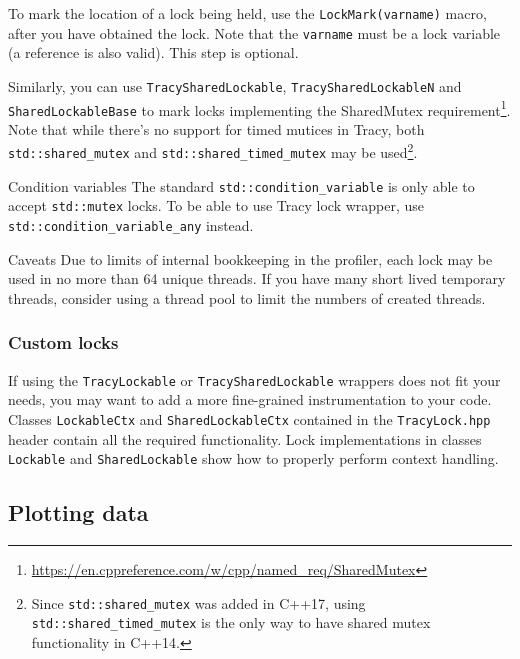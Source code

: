 \documentclass[hidelinks,titlepage,a4paper]{article}
\begin{document}
To mark the location of a lock being held, use the \texttt{LockMark(varname)} macro, after you have obtained the lock. Note that the \texttt{varname} must be a lock variable (a reference is also valid). This step is optional.

Similarly, you can use \texttt{TracySharedLockable}, \texttt{TracySharedLockableN} and \texttt{SharedLockableBase} to mark locks implementing the SharedMutex requirement\footnote{\url{https://en.cppreference.com/w/cpp/named_req/SharedMutex}}. Note that while there's no support for timed mutices in Tracy, both \texttt{std::shared\_mutex} and \texttt{std::shared\_timed\_mutex} may be used\footnote{Since \texttt{std::shared\_mutex} was added in C++17, using \texttt{std::shared\_timed\_mutex} is the only way to have shared mutex functionality in C++14.}.

\begin{bclogo}[
noborder=true,
couleur=black!5,
logo=\bclampe
]{Condition variables}
The standard \texttt{std::condition\_variable} is only able to accept \texttt{std::mutex} locks. To be able to use Tracy lock wrapper, use \texttt{std::condition\_variable\_any} instead.
\end{bclogo}

\begin{bclogo}[
noborder=true,
couleur=black!5,
logo=\bcattention
]{Caveats}
Due to limits of internal bookkeeping in the profiler, each lock may be used in no more than 64 unique threads. If you have many short lived temporary threads, consider using a thread pool to limit the numbers of created threads.
\end{bclogo}

\subsubsection{Custom locks}

If using the \texttt{TracyLockable} or \texttt{TracySharedLockable} wrappers does not fit your needs, you may want to add a more fine-grained instrumentation to your code. Classes \texttt{LockableCtx} and \texttt{SharedLockableCtx} contained in the \texttt{TracyLock.hpp} header contain all the required functionality. Lock implementations in classes \texttt{Lockable} and \texttt{SharedLockable} show how to properly perform context handling.

\subsection{Plotting data}
\label{plottingdata}
\end{document}
